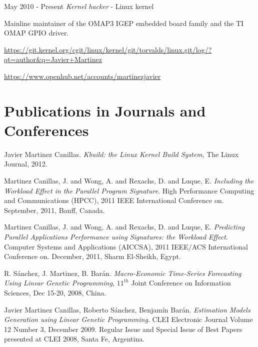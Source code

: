 \documentclass{simplecv}
\begin{document}
\begin{topic}

\item[May 2010 - Present] \emph{Kernel hacker} - Linux kernel

Mainline maintainer of the OMAP3 IGEP embedded board family and the TI OMAP GPIO driver.

\url{https://git.kernel.org/cgit/linux/kernel/git/torvalds/linux.git/log/?qt=author&q=Javier+Martinez}

\url{https://www.openhub.net/accounts/martinezjavier}

\end{topic}

\section{Publications in Journals and Conferences}

\begin{thebibliography}{10}

\footnotesize

Javier Martinez Canillas. \emph{Kbuild: the Linux Kernel Build System}, The Linux Journal, 2012. 

Martinez Canillas, J. and Wong, A. and Rexachs, D. and Luque, E. \emph{Including the Workload Effect in the Parallel Program Signature}. High Performance Computing and Communications (HPCC), 2011 IEEE International Conference on. September, 2011, Banff, Canada.

Martinez Canillas, J. and Wong, A. and Rexachs, D. and Luque, E. \emph{Predicting Parallel Applications Performance using Signatures: the Workload Effect}. Computer Systems and Applications (AICCSA), 2011 IEEE/ACS International Conference on. December, 2011, Sharm El-Sheikh, Egypt.

R. Sánchez, J. Martinez, B. Barán. \emph{Macro-Economic Time-Series Forecasting Using Linear Genetic Programming}, $11^{th}$ Joint Conference on Information Sciences, Dec 15-20, 2008, China. 

Javier Martinez Canillas, Roberto Sánchez, Benjamín Barán. \emph{Estimation Models Generation using Linear Genetic Programming}. CLEI Electronic Journal Volume 12 Number 3, December 2009. Regular Issue and Special Issue of Best Papers presented at CLEI 2008, Santa Fe, Argentina.

\end{thebibliography}
\end{document}
